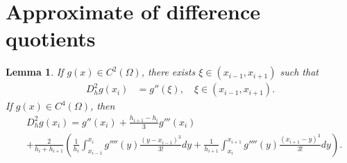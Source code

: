 \documentclass{amsart}
\newtheorem{lemma}[theorem]{Lemma}
\theoremstyle{definition}
\theoremstyle{remark}
\numberwithin{equation}{section}
\begin{document}
\newpage
\appendix

\section{Approximate of difference quotients}

\begin{lemma} \label{lmm:Dh2simd2}
  If \(g(x)\in C^2(\Omega)\),
  there exists \(\xi\in (x_{i-1}, x_{i+1})\) such that
  \begin{equation*} \label{eq:Dh2simd2}
    \begin{aligned}
      D_h^2 g(x_i) & = g''(\xi), \quad \xi \in (x_{i-1}, x_{i+1}).
    \end{aligned}
  \end{equation*}
  If \(g(x) \in C^4(\Omega)\), then
  \begin{equation*} \label{eq:Dh2simd4}
    \begin{aligned}
      & D_h^2 g(x_i) = g''(x_{i}) + \frac{h_{i+1}-h_{i}}{3} g'''(x_{i}) \\
      &  +  \frac{2}{h_i + h_{i+1}}\left( \frac{1}{h_{i}}\int_{x_{i-1}}^{x_i} g''''(y) \frac{(y-x_{i-1})^3}{3!} dy + \frac{1}{h_{i+1}} \int_{x_i}^{x_{i+1}} g''''(y) \frac{(x_{i+1}-y)^3}{3!} dy \right) .
    \end{aligned}
  \end{equation*}
\end{lemma}
\end{document}
